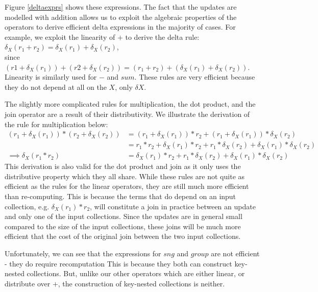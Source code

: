 {{{Figure \ref{deltaexprs} shows these expressions. The fact that the updates are modelled with addition allows us to exploit the algebraic properties of the operators to derive efficient delta expressions in the majority of cases. For example, we exploit the linearity of $+$ to derive the delta rule: \\

$\delta_X(r_1 + r_2) = \delta_X(r_1) + \delta_X(r_2)$, \\

since \\

$(r1 + \delta_X(r_1)) + (r2 + \delta_X(r_2)) = (r_1 + r_2) + (\delta_X(r_1) + \delta_X(r_2))$. \\

Linearity is similarly used for $-$ and $sum$. These rules are very efficient because they do not depend at all on the $X$, only $\delta X$.

The slightly more complicated rules for multiplication, the dot product, and the join operator are a result of their distributivity. We illustrate the derivation of the rule for multiplication below:
\vs
\begin{equation*}
\begin{split}
(r_1 + \delta_X(r_1))*(r_2 + \delta_X(r_2)) &= (r_1 + \delta_X(r_1))*r_2 + (r_1 + \delta_X(r_1))*\delta_X(r_2) \\
&= r_1*r_2 + \delta_X(r_1)*r_2 + r_1*\delta_X(r_2) + \delta_X(r_1) * \delta_X(r_2) \\
\implies \delta_X(r_1*r_2) &= \delta_X(r_1)*r_2 + r_1*\delta_X(r_2) + \delta_X(r_1) * \delta_X(r_2)
\end{split}
\end{equation*}
\vs
This derivation is also valid for the dot product and join as it only uses the distributive property which they all share. While these rules are not quite as efficient as the rules for the linear operators, they are still much more efficient than re-computing. This is because the terms that do depend on an input collection, e.g. $\delta_X(r_1) * r_2$, will constitute a join in practice between an update and only one of the input collections. Since the updates are in general small compared to the size of the input collections, these joins will be much more efficient that the cost of the original join between the two input collections.

Unfortunately, we can see that the expressions for $sng$ and $group$ are not efficient - they do require recomputation This is because they both can construct key-nested collections. But, unlike our other operators which are either linear, or distribute over $+$, the construction of key-nested collections is neither.

}}}
